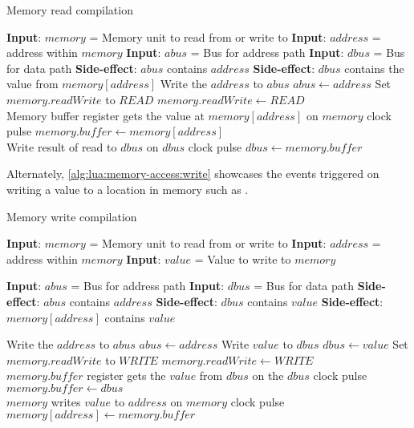 \begin{algorithm}[h!]
    \caption{Memory read compilation}
    \label{alg:lua:memory-access:read}
    \begin{algorithmic}[1]
        \Statex \textbf{Input}: $memory$ = Memory unit to read from or write to
        \Statex \textbf{Input}: $address$ = address within $memory$
        \Statex \textbf{Input}: $abus$ = Bus for address path
        \Statex \textbf{Input}: $dbus$ = Bus for data path
        \Statex \textbf{Side-effect}: $abus$ contains $address$
        \Statex \textbf{Side-effect}: $dbus$ contains the value from $memory\left[address\right]$
        \Statex%
        \Statex Write the $address$ to $abus$
        \State $abus \gets address$
        \Statex Set $memory.readWrite$ to $READ$
        \State $memory.readWrite \gets READ$
        \\
        \Statex Memory buffer register gets the value at $memory\left[address\right]$ on $memory$ clock pulse
        \State $memory.buffer \gets memory\left[address\right]$
        \\
        \Statex Write result of read to $dbus$ on $dbus$ clock pulse
        \State $dbus \gets memory.buffer$
    \end{algorithmic}
\end{algorithm}

\noindent Alternately, \cref{alg:lua:memory-access:write} showcases the events triggered on writing a value to a location in memory such as .

\begin{algorithm}[h!]
    \caption{Memory write compilation}
    \label{alg:lua:memory-access:write}
    \begin{algorithmic}[1]
        \Statex \textbf{Input}: $memory$ = Memory unit to read from or write to
        \Statex \textbf{Input}: $address$ = address within $memory$
        \Statex \textbf{Input}: $value$ = Value to write to $memory$
        
        \Statex \textbf{Input}: $abus$ = Bus for address path
        \Statex \textbf{Input}: $dbus$ = Bus for data path
        \Statex \textbf{Side-effect}: $abus$ contains $address$
        \Statex \textbf{Side-effect}: $dbus$ contains $value$ 
        \Statex \textbf{Side-effect}: $memory\left[address\right]$ contains $value$
        \Statex%
        
        \Statex Write the $address$ to $abus$
        \State $abus \gets address$
        \Statex Write $value$ to $dbus$
        \State $dbus \gets value$
        \Statex Set $memory.readWrite$ to $WRITE$
        \State $memory.readWrite \gets WRITE$
        \\
        \Statex $memory.buffer$ register gets the $value$ from $dbus$ on the $dbus$ clock pulse
        \State $memory.buffer \gets dbus$
        \\
        \Statex $memory$ writes $value$ to $address$ on $memory$ clock pulse
        \State $memory\left[address\right] \gets memory.buffer$
    \end{algorithmic}
\end{algorithm}

